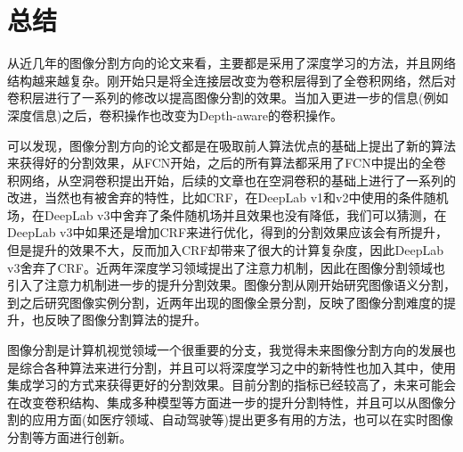 \documentclass[cn]{elegantbook}
\begin{document}
\chapter{总结}
从近几年的图像分割方向的论文来看，主要都是采用了深度学习的方法，并且网络结构越来越复杂。刚开始只是将全连接层改变为卷积层得到了全卷积网络，然后对卷积层进行了一系列的修改以提高图像分割的效果。当加入更进一步的信息(例如深度信息)之后，卷积操作也改变为Depth-aware的卷积操作。

可以发现，图像分割方向的论文都是在吸取前人算法优点的基础上提出了新的算法来获得好的分割效果，从FCN开始，之后的所有算法都采用了FCN中提出的全卷积网络，从空洞卷积提出开始，后续的文章也在空洞卷积的基础上进行了一系列的改进，当然也有被舍弃的特性，比如CRF，在DeepLab v1和v2中使用的条件随机场，在DeepLab v3中舍弃了条件随机场并且效果也没有降低，我们可以猜测，在DeepLab v3中如果还是增加CRF来进行优化，得到的分割效果应该会有所提升，但是提升的效果不大，反而加入CRF却带来了很大的计算复杂度，因此DeepLab v3舍弃了CRF。近两年深度学习领域提出了注意力机制，因此在图像分割领域也引入了注意力机制进一步的提升分割效果。图像分割从刚开始研究图像语义分割，到之后研究图像实例分割，近两年出现的图像全景分割，反映了图像分割难度的提升，也反映了图像分割算法的提升。

图像分割是计算机视觉领域一个很重要的分支，我觉得未来图像分割方向的发展也是综合各种算法来进行分割，并且可以将深度学习之中的新特性也加入其中，使用集成学习的方式来获得更好的分割效果。目前分割的指标已经较高了，未来可能会在改变卷积结构、集成多种模型等方面进一步的提升分割特性，并且可以从图像分割的应用方面(如医疗领域、自动驾驶等)提出更多有用的方法，也可以在实时图像分割等方面进行创新。



\end{document}
